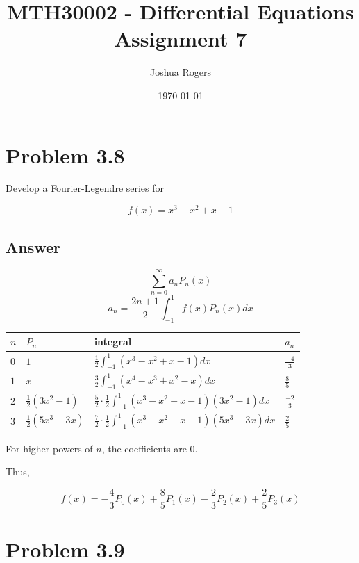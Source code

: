 \documentclass{article}
\title{\vspace{-4cm}MTH30002 - Differential Equations \\Assignment 7}
\author{Joshua Rogers}
\date\today
\begin{document}
\maketitle

\section*{Problem 3.8}

Develop a Fourier-Legendre series for

\begin{equation}\label{38A}
f(x) = x^3-x^2+x-1
\end{equation}


\subsection*{Answer}
$$ \sum_{n=0}^{\infty} a_n P_n (x) $$
$$ a_n = \frac{2n+1}{2} \int_{-1}^{1} f(x) P_n(x) dx $$

\begin{tabular}{
  |p{}
  |p{}
  |p{}
  |p{}|
  }
  \hline
  \centering $n$     & \centering $P_n$     & \centering integral & \centering\arraybackslash $a_n$     \\ \hline
  $0$ & $1$ & $\frac{1}{2} \int_{-1}^{1} \left(x^3-x^2+x-1\right) dx$ & $\frac{-4}{3}$ \\ \hline
  $1$ & $x$ & $\frac{3}{2} \int_{-1}^{1} \left(x^4-x^3+x^2-x\right) dx$ & $\frac{8}{5}$ \\ \hline
  $2$ & $\frac{1}{2} \left(3x^2-1\right)$ & $\frac{5}{2} \cdot \frac{1}{2} \int_{-1}^{1} \left(x^3-x^2+x-1\right)\left(3x^2-1\right) dx$ & $\frac{-2}{3}$ \\ \hline
  $3$ & $\frac{1}{2} \left(5x^3-3x\right)$ & $\frac{7}{2} \cdot \frac{1}{2} \int_{-1}^{1} \left(x^3-x^2+x-1\right)\left(5x^3-3x\right) dx$ & $\frac{2}{5}$ \\ \hline
\end{tabular}


For higher powers of $n$, the coefficients are 0.

Thus,

$$
f(x) = -\frac{4}{3} P_0(x) + \frac{8}{5} P_1(x) - \frac{2}{3} P_2(x) + \frac{2}{5} P_3(x)
$$

\section*{Problem 3.9}
\end{document}

